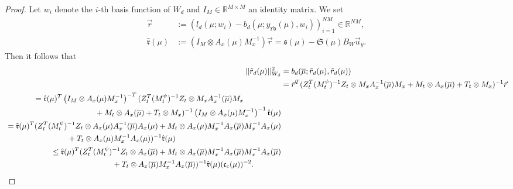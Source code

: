 \documentclass[10pt,a4paper]{amsart}
\newcommand{\RR}{\mathbb{R}}
\begin{document}
\begin{proof}
Let $w_i$ denote the $i$-th basis function of $W_d$ and $I_{M} \in \RR^{M \times M}$ an identity matrix. We set 
\begin{align}
    \Vec{r} &:= \left(l_d(\mu; w_{i}) - b_d(\mu; y_{\texttt{rb}}(\mu), w_{i})\right)_{i = 1}^{NM} \in \RR^{NM},\\
    \hat{\mathfrak{r}}(\mu) &:= \left(I_{M} \otimes A_{x}(\mu)M_{x}^{-1}\right)\Vec{r} = \mathfrak{s}(\mu) - \mathfrak{S}(\mu) B_W \Vec{u}_y.\label{eq:residual_vec_to_assemble}
\end{align}
Then it follows that
\begin{align}
    \vert \vert \Tilde{r}_{d}(\mu) \vert \vert^{2}_{W_{d}} &= b_d(\overline{\mu}; \Tilde{r}_{d}(\mu), \Tilde{r}_{d}(\mu))\\
    &= \Vec{r}^T (Z_t^T (M_t^\psi)^{-1} Z_t \otimes M_{x}A_{x}^{-1}(\overline{\mu})M_{x} + M_{t} \otimes A_{x}(\overline{\mu}) + T_t\otimes M_x)^{-1}\Vec{r}\\
\begin{split}
    &= \hat{\mathfrak{r}}(\mu)^T \left(I_{M} \otimes A_{x}(\mu)M_{x}^{-1}\right)^{- T} (Z_t^T (M_t^\psi)^{-1} Z_t \otimes M_{x}A_{x}^{-1}(\overline{\mu})M_{x} \\&\qquad\qquad\qquad\qquad+ M_{t} \otimes A_{x}(\overline{\mu}) + T_t\otimes M_x)^{-1} \left(I_{M} \otimes A_{x}(\mu)M_{x}^{-1}\right)^{-1} \hat{\mathfrak{r}}(\mu) 
\end{split}
    \\
\begin{split}
    &= \hat{\mathfrak{r}}(\mu)^T (Z_t^T (M_t^\psi)^{-1} Z_t \otimes A_{x}(\mu) A_{x}^{-1}(\overline{\mu}) A_{x}(\mu) + M_{t} \otimes A_{x}(\mu) M_{x}^{-1} A_{x}(\overline{\mu}) M_{x}^{-1} A_{x}(\mu) \\&\qquad\qquad\qquad\qquad+ T_t \otimes A_x(\mu)M_x^{-1}A_x(\mu))^{-1}\hat{\mathfrak{r}}(\mu)
\end{split} 
    \\
\begin{split}\label{eq:estmofrieszresid}
    &\leq \hat{\mathfrak{r}}(\mu)^T (Z_t^T (M_t^\psi)^{-1} Z_t \otimes A_{x}(\overline{\mu}) + M_{t} \otimes A_{x}(\overline{\mu}) M_{x}^{-1} A_{x}(\overline{\mu}) M_{x}^{-1} A_{x}(\overline{\mu}) \\&\qquad\qquad\qquad\qquad+ T_t \otimes A_x(\overline{\mu})M_x^{-1}A_x(\overline{\mu}))^{-1}\hat{\mathfrak{r}}(\mu) (\mathfrak{c}_c(\mu))^{-2}.
\end{split} 
\end{align}

\end{proof}
\end{document}
